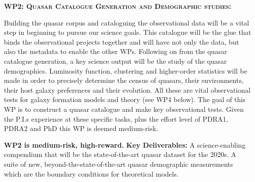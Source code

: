 \medskip 
\medskip
\smallskip
\smallskip
\noindent
\textbf{\textsc{WP2: Quasar Catalogue Generation and Demographic studies:}}  

\smallskip
\smallskip
\noindent
Building the quasar corpus and cataloguing the observational data will
be a vital step in beginning to pursue our science goals. This
catalogue will be the glue that binds the observational projects
together and will have not only the data, but also the metadata to
enable the other WPs.  Following on from the quasar catalogue
generation, a key science output will be the study of the quasar
demographics.  Luminosity function, clustering and higher-order
statistics will be made in order to precisely determine the census of
quasars, their environments, their host galaxy preferences and their
evolution. All these are vital observational tests for galaxy
formation models and theory (see WP4 below). The goal of this WP is to
construct a quasar catalogue and make key observational tests.
Given the P.I.s experience at these specific tasks, plus the effort
level of PDRA1, PDRA2 and PhD this WP is deemed medium-risk.

\smallskip
\smallskip
\noindent
{\bf WP2 is medium-risk, high-reward.}  {\bf Key Deliverables:} A
science-enabling compendium that will be the state-of-the-art quasar
dataset for the 2020s.  A suite of new, beyond-the-state-of-the-art
quasar demographic measurements which are the boundary conditions for
theoretical models.

